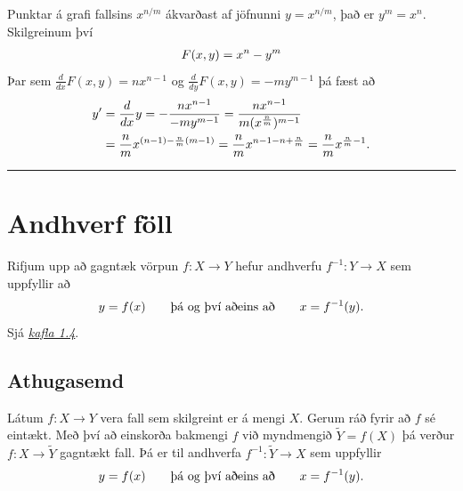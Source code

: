 \documentclass[a4paper,10pt,icelandic]{sphinxmanual}
\begin{document}
Punktar á grafi fallsins \(x^{n/m}\) ákvarðast af jöfnunni \(y=x^{n/m}\), það er
\(y^m = x^n\). Skilgreinum því
\begin{gather}
\begin{split}F(x,y) = x^n-y^m\end{split}\notag
\end{gather}
Þar sem \(\frac d{dx} F(x,y) = nx^{n-1}\) og
\(\frac d{dy} F(x,y) = -my^{m-1}\) þá fæst að
\begin{gather}
\begin{split}\begin{aligned}
y' &= \frac {d}{dx} y =
- \frac{n x^{n-1}}{-m y^{m-1}} =
\frac{n x^{n-1}}{m (x^{\frac nm})^{m-1}} \\
&= \frac nm x^{(n-1) - \frac nm(m-1)}
= \frac nm x^{n-1-n+\frac nm} = \frac nm x^{\frac nm -1}. \end{aligned}\end{split}\notag
\end{gather}

\bigskip\hrule{}\bigskip



\section{Andhverf föll}
\label{kafli03:andhverf-foll}\label{kafli03:index-10}
Rifjum upp að gagntæk vörpun \(f:X\to Y\) hefur andhverfu
\(f^{-1}:Y\to X\) sem uppfyllir að
\begin{gather}
\begin{split}y=f(x)\qquad\mbox{þá og því aðeins að}\qquad x=f^{-1}(y).\end{split}\notag
\end{gather}
Sjá {\hyperref[kafli01:andhverfa]{\emph{kafla 1.4}}}.


\subsection{Athugasemd}
\label{kafli03:athugasemd}
Látum \(f:X \to Y\) vera fall sem skilgreint er á mengi \(X\). Gerum ráð
fyrir að \(f\) sé eintækt. Með því að einskorða bakmengi \(f\) við
myndmengið \(\tilde Y = f(X)\) þá verður \(f:X\to \tilde Y\) gagntækt fall.
Þá er til andhverfa \(f^{-1}:\tilde Y \to X\) sem uppfyllir
\begin{gather}
\begin{split}y=f(x)\qquad\mbox{þá og því aðeins að}\qquad x=f^{-1}(y).\end{split}\notag
\end{gather}
\end{document}
